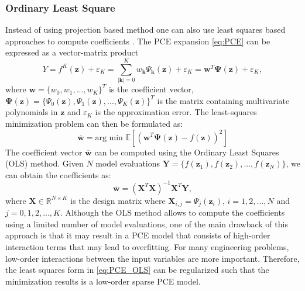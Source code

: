 \documentclass[review]{elsarticle}
\numberwithin{equation}{section}
\numberwithin{equation}{section}
\begin{document}
\subsubsection{Ordinary Least Square}
Instead of using projection based method one can also use least squares based approaches to compute coefficients \cite{Berveiller2006}. The PCE expansion \eqref{eq:PCE} can be expressed as a vector-matrix product
\begin{equation}\label{eq:LSM}
Y = f^{K}(\mathbf{z}) +\varepsilon_K = \sum_{|\mathbf{k}| = 0}^K w_{\mathbf{k}}\Psi_{\mathbf{k}}(\mathbf{z}) + \varepsilon_K = \mathbf{w}^T\boldsymbol{\Psi}(\mathbf{z}) +\varepsilon_K,
\end{equation} 
where $\mathbf{w} = \{w_0,w_1,...,w_K\}^T$ is the coefficient vector, $\boldsymbol{\Psi}(\mathbf{z}) = \{\Psi_0(\mathbf{z}), \Psi_1(\mathbf{z}), ..., \Psi_K(\mathbf{z})\}^T$ is the matrix containing multivariate polynomials in $\mathbf{z}$ and $\varepsilon_K$ is the approximation error. The least-squares minimization problem can then be formulated as:
\begin{equation}\label{eq:PCE_OLS}
\mathbf{\overline{w}} = \text{arg min }\mathbb{E}\left[\left(\mathbf{w}^T \boldsymbol{\Psi}(\mathbf{z}) - f(\mathbf{z})\right)^2\right]
 \end{equation}
The coefficient vector $\mathbf{\overline{w}}$ can be computed using the Ordinary Least Squares (OLS) method. Given $N$ model evaluations $\mathbf{Y} = \{f(\mathbf{z}_1), f(\mathbf{z}_2), ..., f(\mathbf{z}_N)\}$, we can obtain the coefficients as:
\begin{equation}\label{eq:OLS}
\overline{\mathbf{w}} = (\mathbf{X}^T\mathbf{X})^{-1}\mathbf{X}^T\mathbf{Y},
\end{equation}
where $\mathbf{X}\in \mathbb{R}^{N\times K}$ is the design matrix where $\mathbf{X}_{i,j} = \Psi_{j}(\mathbf{z}_i)$, $i = 1,2, ..., N$ and $j = 0,1,2,..., K$. Although the OLS method allows to compute the coefficients using a limited number of model evaluations, one of the main drawback of this approach is that it may result in a PCE model that consists of high-order interaction terms that may lead to overfitting. For many engineering problems, low-order interactions between the input variables are more important. Therefore, the least squares form in \eqref{eq:PCE_OLS} can be regularized such that the minimization results is a low-order sparse PCE model.
\end{document}
